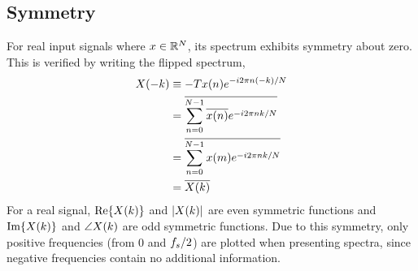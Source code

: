 \subsection{Symmetry}
For real input signals where $x \in \mathbb{R}^N$, its spectrum exhibits symmetry
about zero. This is verified by writing the flipped spectrum,
\begin{align*}
  X(-k)
  &\equiv - T x(n) e^{-i2 \pi n ( -k ) / N} \\
  &= \overline{ \sum_{n=0}^{N-1} \overline{x(n)} e^{-i2 \pi n k / N}} \\
  &= \overline{ \sum_{n=0}^{N-1} x(m) e^{-i2 \pi n k / N}} \\
  &= \overline{X(k)}
\end{align*}
For a real signal, $\textrm{Re}\{X(k)\}$ and $|X(k)|$ are even symmetric functions and $\textrm{Im}\{X(k)\}$ and $\angle X(k)$ are odd symmetric functions. Due to this symmetry, only positive frequencies (from $0$ and $f_s/2$) are plotted when presenting spectra, since negative frequencies contain no additional information.



